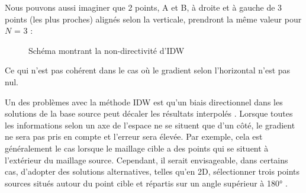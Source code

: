 Nous pouvons aussi imaginer que 2 points, A et B, à droite et à gauche de 3 points (les plus proches) alignés selon la verticale, prendront la même valeur pour \( N \) = 3 :

\begin{figure}[H]
    \centering
    
    \caption{Schéma montrant la non-directivité d'IDW}
\end{figure}

    
Ce qui n'est pas cohérent dans le cas où le gradient selon l'horizontal n'est pas nul.

Un des problèmes avec la méthode IDW est qu'un biais directionnel dans les solutions de la base source peut décaler les résultats interpolés \cite{palmer2009, idw-mapscaping}.
Lorsque toutes les informations selon un axe de l'espace ne se situent que d'un côté, le gradient ne sera pas pris en compte et l'erreur sera élevée. Par exemple, cela est généralement le cas lorsque le maillage cible a des points qui se situent à l’extérieur du maillage source.
Cependant, il serait envisageable, dans certains cas, d'adopter des solutions alternatives, telles qu'en 2D, sélectionner trois points sources situés autour du point cible et répartis sur un angle supérieur à 180° \cite{idw-update}.  %


